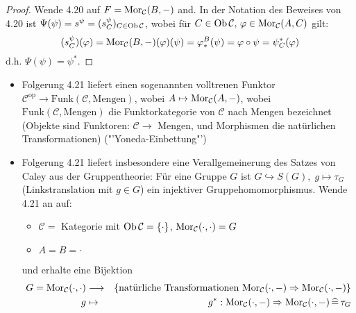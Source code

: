 \begin{proof}
	Wende 4.20 auf $F= \text{Mor}_{\mathcal{C}}(B,-)$ and. In der Notation des Beweises von 4.20 ist $\Psi(\psi) = s^\psi = (s_C^\psi)_{C\in \text{Ob}\,\mathcal{C}}$, wobei für $C\in \text{Ob}\,\mathcal{C}, \, \varphi \in \text{Mor}_{\mathcal{C}}(A,C)$ gilt: 
	$$(s_C^\psi)(\varphi) = \text{Mor}_{\mathcal{C}}(B,-)(\varphi)(\psi) = \varphi_*^B(\psi) = \varphi \circ \psi = \psi^*_C(\varphi)$$
	d.h. $\Psi(\psi) = \psi^*$.
\end{proof}
\begin{anm}
	\begin{itemize}
		\item Folgerung 4.21 liefert einen sogenannten volltreuen Funktor $\mathcal{C}^\text{op} \to \text{Funk}(\mathcal{C}, \text{Mengen})$, wobei $A\mapsto \text{Mor}_{\mathcal{C}}(A,-)$, wobei $\text{Funk}(\mathcal{C}, \text{Mengen})$ die Funktorkategorie von $\mathcal{C}$ nach Mengen bezeichnet (Objekte sind Funktoren: $\mathcal{C} \to $ Mengen, und Morphismen die natürlichen Transformationen) ("'Yoneda-Einbettung"')
		\item Folgerung 4.21 liefert insbesondere eine Verallgemeinerung des Satzes von Caley aus der Gruppentheorie: Für eine Gruppe $G$ ist $G \hookrightarrow S(G), \; g \mapsto \tau_G$ (Linkstranslation mit $g\in G$) ein injektiver Gruppehomomorphismus. Wende 4.21 an auf: \begin{itemize}
			\item $\mathcal{C} = $ Kategorie mit $\text{Ob}\,\mathcal{C} = \{ \cdot  \}$, $\text{Mor}_{\mathcal{C}}( \cdot , \cdot ) = G$
			\item $A=B= \cdot $
		\end{itemize}
	und erhalte eine Bijektion 
	\begin{eqnarray*}
		G= \text{Mor}_{\mathcal{C}}( \cdot, \cdot )  & \longrightarrow & \{\text{natürliche Transformationen } \text{Mor}_{\mathcal{C}}( \cdot, -)  \Rightarrow \text{Mor}_{\mathcal{C}}(\cdot, -) \}\\
		g & \mapsto & g^*: \text{Mor}_{\mathcal{C}}( \cdot, -) \Rightarrow \text{Mor}_{\mathcal{C}}( \cdot, -) \, \widehat{=} \, \tau_G
	\end{eqnarray*}
	\end{itemize}
\end{anm}
\newpage

